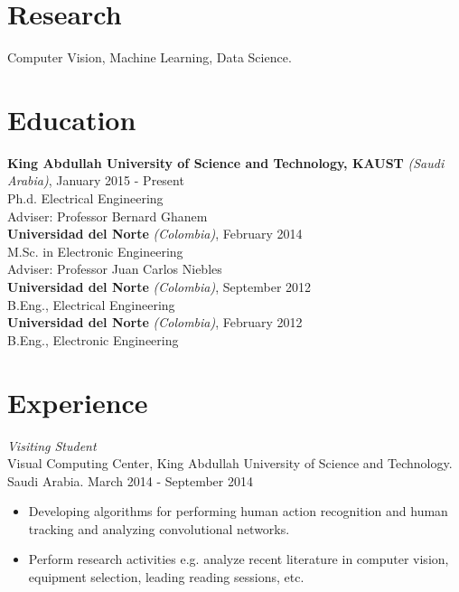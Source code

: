 \documentclass[margin]{res}
\begin{document}
 
 
 
\address{{\bf Present Address} \\ Al Khawarizmi Building (Bldg 1), 2106-WS06
          \\ Thuwal 23955-6900, Kingdom of Saudi Arabia}
\address{{\bf Contact} \\ escorciav@gmail.com - victor.escorcia@kaust.edu.sa}
 
\begin{resume} 
 
\section{Research} 
Computer Vision, Machine Learning, Data Science.


\section{Education}
\textbf{King Abdullah University of Science and Technology, KAUST}
\textit{(Saudi Arabia)}, January 2015 - Present \\
Ph.d. Electrical Engineering\\
\bigskip Adviser: Professor Bernard Ghanem\\
\textbf{Universidad del Norte} \textit{(Colombia)}, February 2014 \\
M.Sc. in Electronic Engineering\\
\bigskip Adviser: Professor Juan Carlos Niebles\\
\textbf{Universidad del Norte} \textit{(Colombia)}, September 2012 \\
B.Eng., Electrical Engineering\\
\textbf{Universidad del Norte} \textit{(Colombia)}, February 2012 \\
B.Eng., Electronic Engineering\\
 

\section{Experience}
 \textit{Visiting Student}\\
 Visual Computing Center, King Abdullah University of Science and Technology.
 Saudi Arabia. \hfill March 2014 - September 2014 \\
 \begin{itemize} \itemsep -2pt %
 \item Developing algorithms for performing human action recognition and human
       tracking and analyzing convolutional networks.
 \item Perform research activities e.g. analyze recent literature in computer
       vision, equipment selection, leading reading sessions, etc.
 \end{itemize}
 

\end{resume}
\end{document}
